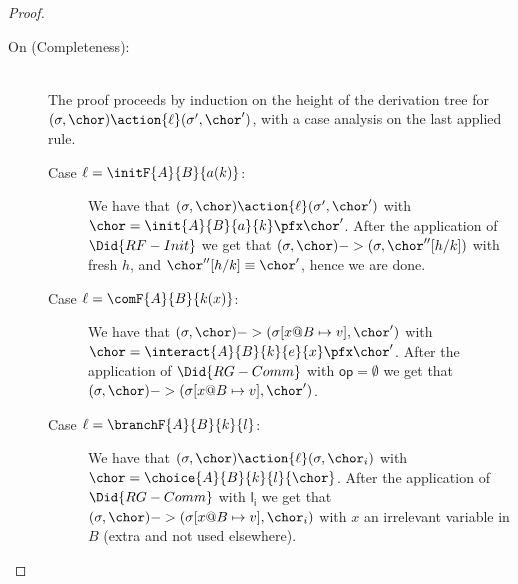 \begin{proposition}
\begin{proof}
\begin{description}
\item[On (Completeness):] \hfill \\
The proof proceeds by induction on the height of the derivation tree for $(\sigma,\chor) \action{\ell} (\sigma',\chor')$,
with a case analysis on the last applied rule. 

\begin{description}
  \item[Case $\ell = \initF{A}{B}{a(k)}$:] We have that $(\sigma,
    \chor) \action{\ell} (\sigma', \chor')$ with $\chor =
    \init{A}{B}{a}{k} \pfx \chor'$. After the application of
    $\Did{RF-Init}$ we get that $(\sigma,\chor)->(\sigma,\chor''[h/k])$
    with fresh $h$, and $\chor''[h/k] \equiv \chor'$, hence we are
    done.
    \item[Case $\ell = \comF{A}{B}{k(x)}$:] We have that
      $(\sigma,\chor) ->(\sigma[x@B \mapsto v], \chor')$ with $\chor =
      \interact{A}{B}{k}{e}{x} \pfx \chor'$. After the application of
      $\Did{RG-Comm}$ with $\mathsf{op} = \emptyset$ we get that
      $(\sigma,\chor)->(\sigma[x@B \mapsto v], \chor')$.
     \item[Case $\ell = \branchF{A}{B}{k}{l}$:] We have that
       $(\sigma,\chor)\action{\ell}(\sigma,\chor_i)$ with $\chor =
       \choice{A}{B}{k}{l}{\chor}$. After the application of
       $\Did{RG-Comm}$ with $\mathsf{l_i}$ we get that $(\sigma,\chor)
       ->(\sigma[x@B \mapsto v], \chor_i)$ with $x$ an irrelevant
       variable in $B$ (extra and not used elsewhere).
\end{description}

\end{description}
\end{proof}
\end{proposition}


